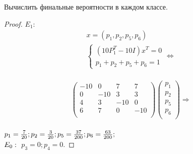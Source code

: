 \begin{problem}
Вычислить финальные вероятности в каждом классе.
\end{problem}

\begin{proof}
$E_1$:
\begin{gather*}
    x = (p_1, p_2, p_5, p_6)\\
    \begin{cases}
        (10P_1^T - 10I)x^T = 0 \\
        p_1 + p_2 + p_5 + p_6 = 1
    \end{cases} \Leftrightarrow \\
\end{gather*}

\[
\begin{pmatrix}
    -10 & 0 & 7 & 7 \\
    0 & -10 & 3 & 3 \\
    4 & 3 & -10 & 0 \\
    6 & 7 & 0 & -10 \\
\end{pmatrix}
\begin{pmatrix}
    p_1 \\
    p_2 \\
    p_5 \\
    p_6 \\
\end{pmatrix}
\Rightarrow
\]\\
$p_1 = \frac{7}{20}; p_2 = \frac{3}{20}; p_5 = \frac{37}{200}; p_6 = \frac{63}{200};\\$\\
$E_0:\\$
$p_3 = 0; p_4 = 0$.
\end{proof}
